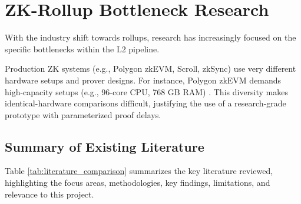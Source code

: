 \section{ZK-Rollup Bottleneck Research}
\label{sec:zk_rollup_bottleneck_research}

With the industry shift towards rollups, research has increasingly focused on the specific bottlenecks within the L2 pipeline.




Production ZK systems (e.g., Polygon zkEVM, Scroll, zkSync) use very different hardware setups and prover designs. For instance, Polygon zkEVM demands high-capacity setups (e.g., 96-core CPU, 768 GB RAM) \citep{chaliasos2024analyzing}. This diversity makes identical-hardware comparisons difficult, justifying the use of a research-grade prototype with parameterized proof delays.

\subsection{Summary of Existing Literature}
\label{sec:literature_summary}

Table \ref{tab:literature_comparison} summarizes the key literature reviewed, highlighting the focus areas, methodologies, key findings, limitations, and relevance to this project.

